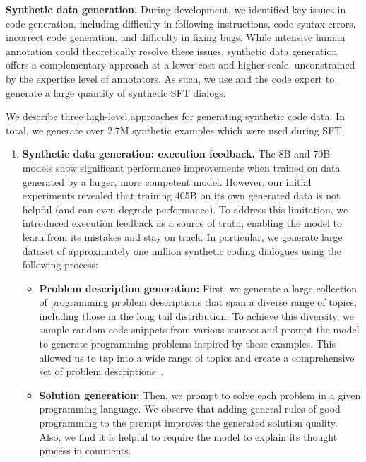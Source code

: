 \textbf{Synthetic data generation.}
During development, we identified key issues in code generation, including difficulty in following instructions, code syntax errors, incorrect code generation, and difficulty in fixing bugs. While intensive human annotation could theoretically resolve these issues, synthetic data generation offers a complementary approach at a lower cost and higher scale, unconstrained by the expertise level of annotators. As such, we use \llamathree and the code expert to generate a large quantity of synthetic SFT dialogs. 

We describe three high-level approaches for generating synthetic code data. In total, we generate over $2.7$M synthetic examples which were used during SFT.

\begin{enumerate}
    \item{\textbf{Synthetic data generation: execution feedback.}} The 8B and 70B models show significant performance improvements when trained on data generated by a larger, more competent model. However, our initial experiments revealed that training \llamathree 405B on its own generated data is not helpful (and can even degrade performance). To address this limitation, we introduced execution feedback as a source of truth, enabling the model to learn from its mistakes and stay on track. %
    In particular, we generate large dataset of approximately one million synthetic coding dialogues using the following process:


    \begin{itemize}
        \item \textbf{Problem description generation:}
        First, we generate a large collection of programming problem descriptions that span a diverse range of topics, including those in the long tail distribution. To achieve this diversity, we sample random code snippets from various sources and prompt the model to generate programming problems inspired by these examples. This allowed us to tap into a wide range of topics and create a comprehensive set of problem descriptions~\citep{wei2024magicoderempoweringcodegeneration}.
        
        
        \item \textbf{Solution generation:} Then, we prompt \llamathree to solve each problem in a given programming language. We observe that adding general rules of good programming to the prompt improves the generated solution quality. Also, we find it is helpful to require the model to explain its thought process in comments.
        

\end{itemize}
\end{enumerate}
